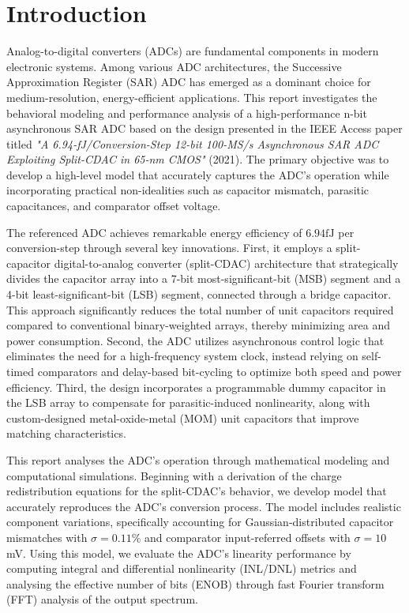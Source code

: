 \section{Introduction}

Analog-to-digital converters (ADCs) are fundamental components in modern electronic systems. Among various ADC architectures, the Successive Approximation Register (SAR) ADC has emerged as a dominant choice for medium-resolution, energy-efficient applications. This report investigates the behavioral modeling and performance analysis of a high-performance n-bit asynchronous SAR ADC based on the design presented in the IEEE Access paper titled \textit{"A 6.94-fJ/Conversion-Step 12-bit 100-MS/s Asynchronous SAR ADC Exploiting Split-CDAC in 65-nm CMOS"} (2021)\textsuperscript{\cite{article}}. The primary objective was to develop a high-level model that accurately captures the ADC's operation while incorporating practical non-idealities such as capacitor mismatch, parasitic capacitances, and comparator offset voltage.

The referenced ADC achieves remarkable energy efficiency of $6.94 \si{\femto \joule}$ per conversion-step through several key innovations. First, it employs a split-capacitor digital-to-analog converter (split-CDAC) architecture that strategically divides the capacitor array into a 7-bit most-significant-bit (MSB) segment and a 4-bit least-significant-bit (LSB) segment, connected through a bridge capacitor. This approach significantly reduces the total number of unit capacitors required compared to conventional binary-weighted arrays, thereby minimizing area and power consumption. Second, the ADC utilizes asynchronous control logic that eliminates the need for a high-frequency system clock, instead relying on self-timed comparators and delay-based bit-cycling to optimize both speed and power efficiency. Third, the design incorporates a programmable dummy capacitor in the LSB array to compensate for parasitic-induced nonlinearity, along with custom-designed metal-oxide-metal (MOM) unit capacitors that improve matching characteristics.

This report analyses the ADC's operation through mathematical modeling and computational simulations. Beginning with a derivation of the charge redistribution equations for the split-CDAC's behavior, we develop model that accurately reproduces the ADC's conversion process. The model includes realistic component variations, specifically accounting for Gaussian-distributed capacitor mismatches with $\sigma = 0.11\%$ and comparator input-referred offsets with $\sigma = 10$ mV. Using this model, we evaluate the ADC's linearity performance by computing integral and differential nonlinearity (INL/DNL) metrics and analysing the effective number of bits (ENOB) through fast Fourier transform (FFT) analysis of the output spectrum.

